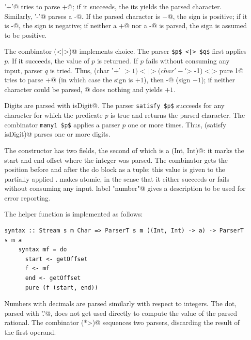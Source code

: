 \documentclass[UdineBachThesis,american,11pt,draft]{PhdThesis}
\begin{document}
  \lstinline@char '+'@ tries to parse \lstinline@+@; if it succeeds, the its
  yields the parsed character. Similarly, \lstinline@char '-'@ parses a
  \lstinline@-@. If the parsed character is \lstinline@+@, the sign is positive;
  if it is \lstinline@-@, the sign is negative; if neither a \lstinline@+@ nor a
  \lstinline@-@ is parsed, the sign is assumed to be positive.

  The combinator \lstinline@(<|>)@ implements choice. The parser
  \lstinline[mathescape]@$p$ <|> $q$@ first applies $p$. If it succeeds, the
  value of $p$ is returned. If $p$ fails without consuming any input, parser $q$
  is tried. Thus, \lstinline@(char '+' $> 1) <|> (char '-' $> -1) <|> pure 1@
  tries to parse \lstinline@+@ (in which case the sign is $+1$), then
  \lstinline@-@ (sign $-1$); if neither character could be parsed,
  @ does nothing and yields $+1$.

  Digits are parsed with \lstinline@satisfy isDigit@. The parser
  \lstinline[mathescape]@satisfy $p$@ succeeds for any character for which the
  predicate $p$ is true and returns the parsed character. The combinator
  \lstinline[mathescape]@many1 $p$@ applies a parser $p$ one or more times.
  Thus,  (satisfy isDigit)@ parses one or more digits.

  The constructor \lstinline@IntegerExpression@ has two fields, the second of
  which is a \lstinline@(Int, Int)@: it marks the start and end offset where the
  integer was parsed. The \lstinline@syntax@ combinator gets the position before
  and after the do block as a tuple; this value is given to the partially
  applied \lstinline@IntegerExpression@. \lstinline@try@ makes
  \lstinline@integerExpression@ atomic, in the sense that it either succeeds or
  fails without consuming any input. \lstinline@flip label "number"@ gives a
  description to be used for error reporting.

  The helper function \lstinline@syntax@ is implemented as follows:

  \begin{lstlisting}[gobble=4,basicstyle=\ttfamily\small]
    syntax :: Stream s m Char => ParserT s m ((Int, Int) -> a) -> ParserT s m a
    syntax mf = do
      start <- getOffset
      f <- mf
      end <- getOffset
      pure (f (start, end))
  \end{lstlisting}

  Numbers with decimals are parsed similarly with respect to integers. The dot,
  parsed with \lstinline@char '.'@, does not get used directly to compute the
  value of the parsed rational. The combinator \lstinline@(*>)@ sequences two
  parsers, discarding the result of the first operand.
\end{document}
